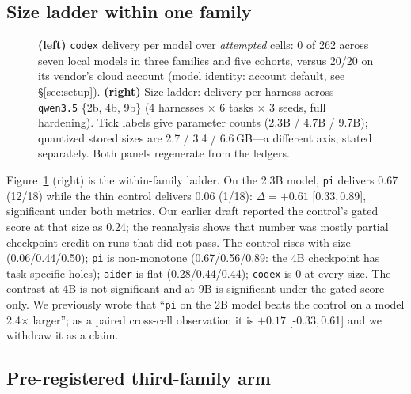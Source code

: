 \documentclass[10pt]{article}
\newcommand{\ci}[2]{[#1,\,#2]}
\begin{document}
\subsection{Size ladder within one family}
\label{sec:ladder}

\begin{figure}[t]
\centering
\begin{minipage}[t]{0.48\linewidth}\centering\end{minipage}\hfill
\begin{minipage}[t]{0.48\linewidth}\centering\end{minipage}
\caption{\textbf{(left)} \texttt{codex} delivery per model over \emph{attempted} cells: 0 of 262
across seven local models in three families and five cohorts, versus 20/20 on its vendor's cloud
account (model identity: account default, see \S\ref{sec:setup}). \textbf{(right)} Size ladder:
delivery per harness across \texttt{qwen3.5} \{2b, 4b, 9b\} (4 harnesses $\times$ 6 tasks $\times$
3 seeds, full hardening). Tick labels give parameter counts (2.3B / 4.7B / 9.7B); quantized stored
sizes are 2.7 / 3.4 / 6.6\,GB---a different axis, stated separately. Both panels regenerate from
the ledgers.}
\label{fig:main}
\end{figure}

Figure~\ref{fig:main} (right) is the within-family ladder. On the 2.3B model, \texttt{pi} delivers
0.67 (12/18) while the thin control delivers 0.06 (1/18): $\Delta{=}{+}0.61$ \ci{0.33}{0.89},
significant under both metrics. Our earlier draft reported the control's gated score at that size as
0.24; the reanalysis shows that number was mostly partial checkpoint credit on runs that did not
pass. The control rises with size (0.06/0.44/0.50); \texttt{pi} is non-monotone (0.67/0.56/0.89: the
4B checkpoint has task-specific holes); \texttt{aider} is flat (0.28/0.44/0.44); \texttt{codex} is
0 at every size. The contrast at 4B is not significant and at 9B is significant under the gated
score only. We previously wrote that ``\texttt{pi} on the 2B model beats the control on a model
2.4$\times$ larger''; as a paired cross-cell observation it is $+0.17$ \ci{-0.33}{0.61} and we
withdraw it as a claim.

\subsection{Pre-registered third-family arm}
\label{sec:phased}
\end{document}
